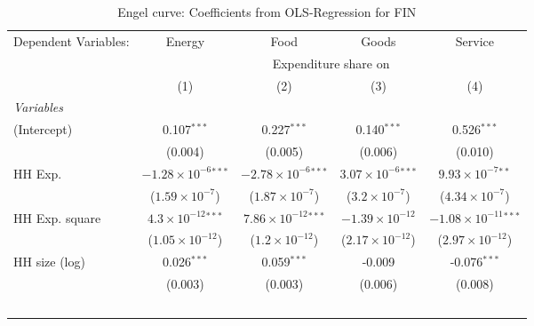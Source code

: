 
\begin{table}[htbp!]
   \centering
   \small
   \begin{adjustbox}{width = 1\textwidth, max height = 0.95\textheight, center}
      \begin{threeparttable}[b]
         \caption{\label{tab:Engel_parametric_FIN} Engel curve: Coefficients from OLS-Regression for FIN}
         \begin{tabular}{lcccc}
            \tabularnewline \midrule \midrule
            Dependent Variables: & Energy                         & Food                           & Goods                         & Service\\  
             & \multicolumn{4}{c}{Expenditure share on} \\ 
                                 & (1)                            & (2)                            & (3)                           & (4)\\  
            \midrule
            \emph{Variables}\\
            (Intercept)          & 0.107$^{***}$                  & 0.227$^{***}$                  & 0.140$^{***}$                 & 0.526$^{***}$\\   
                                 & (0.004)                        & (0.005)                        & (0.006)                       & (0.010)\\   
            HH Exp.              & $-1.28\times 10^{-6}$$^{***}$  & $-2.78\times 10^{-6}$$^{***}$  & $3.07\times 10^{-6}$$^{***}$  & $9.93\times 10^{-7}$$^{**}$\\    
                                 & ($1.59\times 10^{-7}$)         & ($1.87\times 10^{-7}$)         & ($3.2\times 10^{-7}$)         & ($4.34\times 10^{-7}$)\\    
            HH Exp. square       & $4.3\times 10^{-12}$$^{***}$   & $7.86\times 10^{-12}$$^{***}$  & $-1.39\times 10^{-12}$        & $-1.08\times 10^{-11}$$^{***}$\\    
                                 & ($1.05\times 10^{-12}$)        & ($1.2\times 10^{-12}$)         & ($2.17\times 10^{-12}$)       & ($2.97\times 10^{-12}$)\\    
            HH size (log)        & 0.026$^{***}$                  & 0.059$^{***}$                  & -0.009                        & -0.076$^{***}$\\   
                                 & (0.003)                        & (0.003)                        & (0.006)                       & (0.008)\\   
$$
\end{tabular}
\end{threeparttable}
\end{adjustbox}
\end{table}
